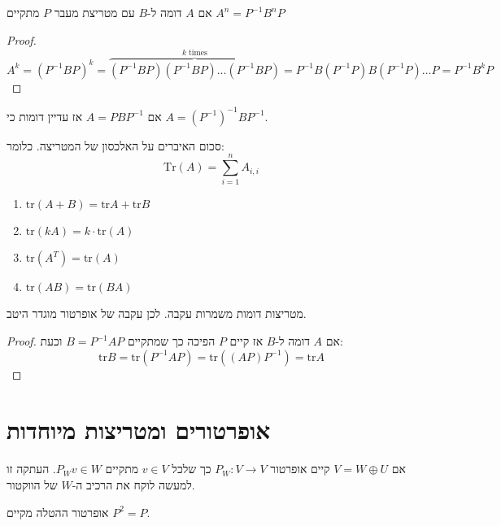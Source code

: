\documentclass{tstextbook}
\begin{document}
\begin{proposition}
אם \(A\) דומה ל-\(B\) עם מטריצת מעבר \(P\) מתקיים \(A^{n}=P ^{-1} B^{n}P\)

\end{proposition}
\begin{proof}
$$A^{k}=(P ^{-1} B P)^{k}=\overbrace{ (P ^{-1}B P) (P ^{-1} B P)\dots (P ^{-1} B P) }^{ k\;\mathrm{ times} }= P ^{-1} B (P ^{-1} P) B (P ^{-1} P)\dots P=P ^{-1} B^{ k} P$$

\end{proof}
\begin{remark}
אם \(A=PBP ^{-1}\) אז עדיין דומות כי \(A=(P ^{-1})^{-1} B P ^{-1}\). 

\end{remark}
\begin{definition}[עקבה]
סכום האיברים על האלכסון של המטריצה. כלומר:
$$\mathrm{Tr}(A)=\sum_{i=1}^{n} A_{i,i}$$

\end{definition}
\begin{proposition}
  \begin{enumerate}
    \item \(\mathrm{tr}(A+B)=\mathrm{tr}A+\mathrm{tr}B\)


    \item \(\mathrm{tr}(k A)=k\cdot \mathrm{tr}(A)\)


    \item \(\mathrm{tr}(A^{T})=\mathrm{tr}(A)\)


    \item \(\mathrm{tr}(A B)=\mathrm{tr}(B A)\)


  \end{enumerate}
\end{proposition}
\begin{proposition}
מטריצות דומות משמרות עקבה. לכן עקבה של אופרטור מוגדר היטב.

\end{proposition}
\begin{proof}
אם \(A\) דומה ל-\(B\) אז קיים \(P\) הפיכה כך שמתקיים \(B=P ^{-1}A P\) וכעת:
$$\mathrm{tr}B=\mathrm{tr}(P^{-1}A P)=\mathrm{tr}((A P)P^{-1})=\mathrm{tr}A$$

\end{proof}
\section{אופרטורים ומטריצות מיוחדות}

\begin{definition}
אם \(V=W\oplus U\) קיים אופרטור \(P_{W}:V\to V\) כך שלכל \(v\in V\) מתקיים \(P_{W}v \in W\). העתקה זו למעשה לוקח את הרכיב ה-\(W\) של הווקטור.

\end{definition}
\begin{proposition}
אופרטור ההטלה מקיים \(P^{2}=P\).

\end{proposition}
\end{document}
